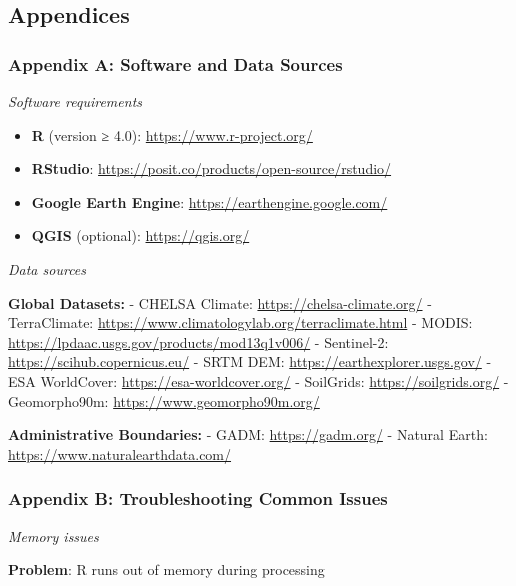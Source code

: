 \documentclass[
  10pt,
  b5paper,
  oneside]{book}
\providecommand{\tightlist}{%
  \setlength{\itemsep}{0pt}\setlength{\parskip}{0pt}}
\begin{document}
\subsection*{Appendices}\label{appendices}

\subsubsection*{Appendix A: Software and Data Sources}\label{appendix-a-software-and-data-sources}

\emph{Software requirements}

\begin{itemize}
\tightlist
\item
  \textbf{R} (version ≥ 4.0): \url{https://www.r-project.org/}
\item
  \textbf{RStudio}: \url{https://posit.co/products/open-source/rstudio/}
\item
  \textbf{Google Earth Engine}: \url{https://earthengine.google.com/}
\item
  \textbf{QGIS} (optional): \url{https://qgis.org/}
\end{itemize}

\emph{Data sources}

\textbf{Global Datasets:} - CHELSA Climate: \url{https://chelsa-climate.org/} - TerraClimate: \url{https://www.climatologylab.org/terraclimate.html} - MODIS: \url{https://lpdaac.usgs.gov/products/mod13q1v006/} - Sentinel-2: \url{https://scihub.copernicus.eu/} - SRTM DEM: \url{https://earthexplorer.usgs.gov/} - ESA WorldCover: \url{https://esa-worldcover.org/} - SoilGrids: \url{https://soilgrids.org/} - Geomorpho90m: \url{https://www.geomorpho90m.org/}

\textbf{Administrative Boundaries:} - GADM: \url{https://gadm.org/} - Natural Earth: \url{https://www.naturalearthdata.com/}

\subsubsection*{Appendix B: Troubleshooting Common Issues}\label{appendix-b-troubleshooting-common-issues}

\emph{Memory issues}

\textbf{Problem}: R runs out of memory during processing
\end{document}
